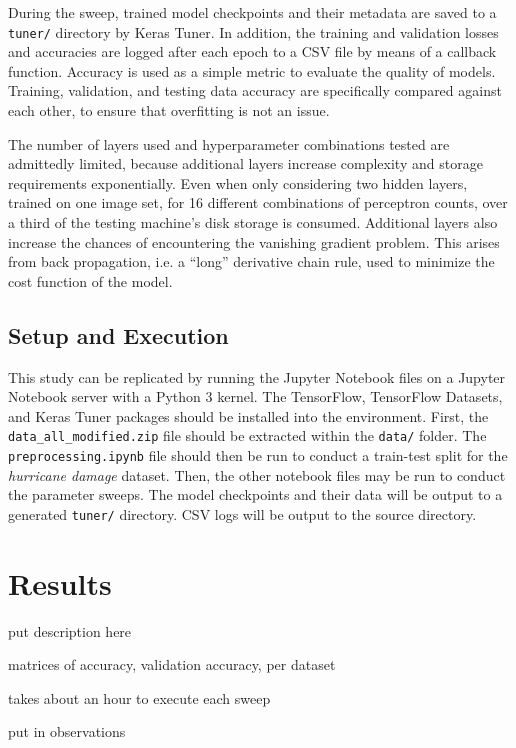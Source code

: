 \documentclass{article}
\begin{document}
During the sweep, trained model checkpoints and their metadata are saved to a \verb|tuner/| directory by Keras Tuner. In addition, the training and validation losses and accuracies are logged after each epoch to a CSV file by means of a callback function. Accuracy is used as a simple metric to evaluate the quality of models. Training, validation, and testing data accuracy are specifically compared against each other, to ensure that overfitting is not an issue.

The number of layers used and hyperparameter combinations tested are admittedly limited, because additional layers increase complexity and storage requirements exponentially. Even when only considering two hidden layers, trained on one image set, for 16 different combinations of perceptron counts, over a third of the testing machine's disk storage is consumed. Additional layers also increase the chances of encountering the vanishing gradient problem. This arises from back propagation, i.e. a ``long'' derivative chain rule, used to minimize the cost function of the model.

\subsection{Setup and Execution}

This study can be replicated by running the Jupyter Notebook files on a Jupyter Notebook server with a Python 3 kernel. The TensorFlow, TensorFlow Datasets, and Keras Tuner packages should be installed into the environment. First, the \verb|data_all_modified.zip| file should be extracted within the \verb|data/| folder. The \verb|preprocessing.ipynb| file should then be run to conduct a train-test split for the \emph{hurricane damage} dataset. Then, the other notebook files may be run to conduct the parameter sweeps. The model checkpoints and their data will be output to a generated \verb|tuner/| directory. CSV logs will be output to the source directory.

\section{Results}

\FloatBarrier

put description here

matrices of accuracy, validation accuracy, per dataset

takes about an hour to execute each sweep

put in observations
\end{document}
